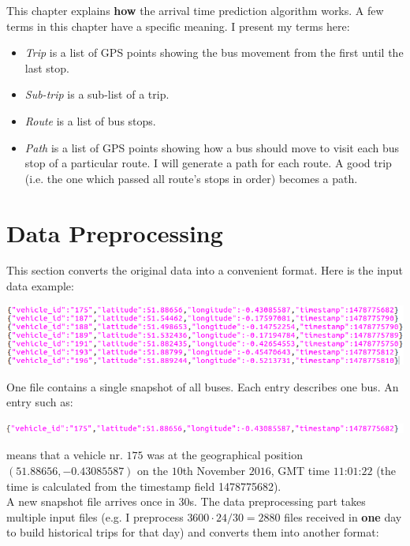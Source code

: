 \documentclass[12pt,a4paper,oneside,openright]{report}
\begin{document}
This chapter explains \textbf{how} the arrival time prediction algorithm works. A few terms in
this chapter have a specific meaning. I present my terms here:

\begin{itemize}

\item \textit{Trip} is a list of GPS points showing the bus movement from the first until the last stop.
\item \textit{Sub-trip} is a sub-list of a trip.
\item \textit{Route} is a list of bus stops.
\item \textit{Path} is a list of GPS points showing how a bus should move to visit each bus stop of a particular route. I will
generate a path for each route. A good trip (i.e. the one which passed all route's stops in order) becomes a path.

\end{itemize}

\section{Data Preprocessing}

\label{3.1}

This section converts the original data into a convenient format. Here is the input data example:

\:

\includegraphics[scale=0.6]{figs/starting_data.png}

One file contains a single snapshot of all buses. Each entry describes one bus. An entry such as:

\includegraphics[width=\textwidth]{figs/entry.png}

means that a vehicle nr. $175$ was at the geographical position
$(51.88656, -0.43085587)$ on the $10$th November $2016$, GMT time
$11$:$01$:$22$ (the time is calculated from the timestamp field 1478775682). \\

A new snapshot file arrives once in $30$s. The data preprocessing part
takes multiple input files (e.g. I preprocess $3600 \cdot 24 / 30 = 2880$ files
received in \textbf{one} day to build historical trips for that day) and converts them
into another format: 
\end{document}

